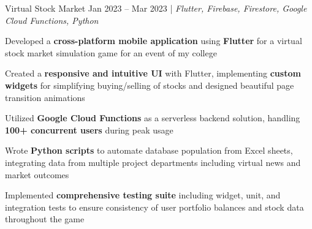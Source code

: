 \resumeSubheadings
{Virtual Stock Market }
{Jan 2023 -- Mar 2023}
{}{}{| \textit{Flutter, Firebase, Firestore, Google Cloud Functions, Python}}
\resumeItemListStart
\item Developed a \textbf{cross-platform mobile application} using \textbf{Flutter} for a virtual stock market simulation game for an event of my college
\item Created a \textbf{responsive and intuitive UI} with Flutter, implementing \textbf{custom widgets} for simplifying buying/selling of stocks and designed beautiful page transition animations
\item Utilized \textbf{Google Cloud Functions} as a serverless backend solution, handling \textbf{100+ concurrent users} during peak usage
\item Wrote \textbf{Python scripts} to automate database population from Excel sheets, integrating data from multiple project departments including virtual news and market outcomes
\item Implemented \textbf{comprehensive testing suite} including widget, unit, and integration tests to ensure consistency of user portfolio balances and stock data throughout the game
\resumeItemListEnd